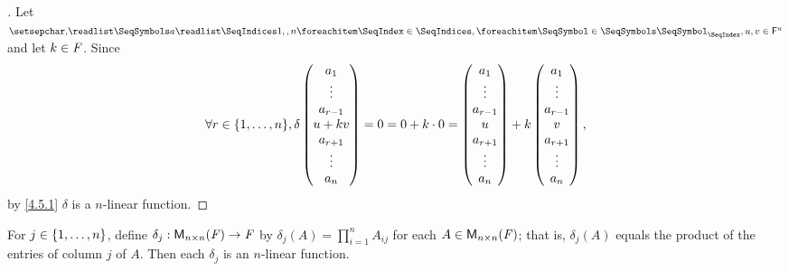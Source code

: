 \begin{proof}[]
	Let \(\seq{a}{1,,n}, u, v \in \vs{F}^n\) and let \(k \in \mathit{F}\).
	Since
	\[
		\forall r \in \set{1, \dots, n}, \delta\begin{pmatrix}
			a_1       \\
			\vdots    \\
			a_{r - 1} \\
			u + kv    \\
			a_{r + 1} \\
			\vdots    \\
			a_n
		\end{pmatrix} = 0 = 0 + k \cdot 0 = \begin{pmatrix}
			a_1       \\
			\vdots    \\
			a_{r - 1} \\
			u         \\
			a_{r + 1} \\
			\vdots    \\
			a_n
		\end{pmatrix} + k \begin{pmatrix}
			a_1       \\
			\vdots    \\
			a_{r - 1} \\
			v         \\
			a_{r + 1} \\
			\vdots    \\
			a_n
		\end{pmatrix},
	\]
	by \cref{4.5.1} \(\delta\) is a \(n\)-linear function.
\end{proof}

\begin{eg}\label{4.5.3}
	For \(j \in \left\lbrace1, \dots, n\right\rbrace\), define \(\delta_j : \mathsf{M}_{{n} \times n}({\mathit{F}}) \to \mathit{F}\) by \(\delta_j(A) = \prod_{i = 1}^n A_{i j}\) for each \(A \in \mathsf{M}_{{n} \times n}({\mathit{F}})\);
	that is, \(\delta_j(A)\) equals the product of the entries of column \(j\) of \(A\).
	Then each \(\delta_j\) is an \(n\)-linear function.
\end{eg}

